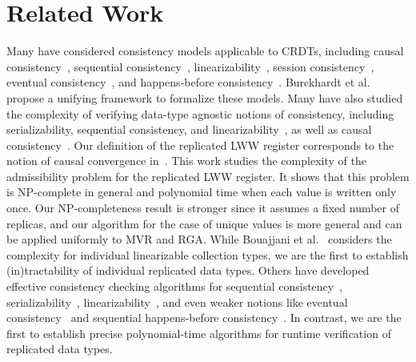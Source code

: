 
\section{Related Work}
\label{sec:crdt:related}

Many have considered consistency models applicable to CRDTs, including causal consistency~\cite{DBLP:journals/cacm/Lamport78}, sequential consistency~\cite{DBLP:journals/tc/Lamport79}, linearizability~\cite{DBLP:journals/toplas/HerlihyW90}, session consistency~\cite{DBLP:conf/pdis/TerryDPSTW94}, eventual consistency~\cite{DBLP:conf/sosp/TerryTPDSH95}, and happens-before consistency~\cite{DBLP:conf/popl/MansonPA05}. Burckhardt et al.~\cite{DBLP:journals/ftpl/Burckhardt14, DBLP:conf/popl/BurckhardtGYZ14} propose a unifying framework to formalize these models. Many have also studied the complexity of verifying data-type agnostic notions of consistency, including serializability, sequential consistency, and linearizability~\cite{DBLP:journals/jacm/Papadimitriou79b, DBLP:journals/siamcomp/GibbonsK97, DBLP:journals/iandc/AlurMP00, DBLP:conf/spaa/BinghamCH03, DBLP:conf/cav/FarzanM08, DBLP:conf/esop/BouajjaniEEH13, DBLP:conf/netys/Hamza15}, as well as causal consistency~\cite{DBLP:conf/popl/BouajjaniEGH17}. Our definition of the replicated LWW register corresponds to the notion of causal convergence in~\cite{DBLP:conf/popl/BouajjaniEGH17}. This work studies the complexity of the admissibility problem for the replicated LWW register. It shows that this problem is NP-complete in general and polynomial time when each value is written only once. 
Our NP-completeness result is stronger since it assumes a fixed number of replicas, and our algorithm for the case of unique values is more general and can be applied uniformly to MVR and RGA. 
While Bouajjani et al.~\cite{DBLP:journals/iandc/BouajjaniEEH18, DBLP:journals/pacmpl/EmmiE18} considers the complexity for individual linearizable collection types, we are the first to establish (in)tractability of individual replicated data types. Others have developed effective consistency checking algorithms for sequential consistency~\cite{DBLP:conf/cav/HenzingerQR99a, DBLP:journals/tpds/Qadeer03, DBLP:conf/cav/BinghamCHQZ04, DBLP:conf/pldi/BurckhardtAM07}, serializability~\cite{DBLP:conf/fmcad/0002OPTZ07, DBLP:conf/cav/FarzanM08, DBLP:conf/pldi/GuerraouiHJS08, DBLP:conf/pldi/EmmiMM10}, linearizability~\cite{DBLP:journals/jpdc/WingG93, DBLP:conf/pldi/BurckhardtDMT10, DBLP:conf/pldi/EmmiEH15, DBLP:journals/concurrency/Lowe17}, and even weaker notions like eventual consistency~\cite{DBLP:conf/popl/BouajjaniEH14} and sequential happens-before consistency~\cite{DBLP:conf/cav/EmmiE18, DBLP:journals/pacmpl/EmmiE19}. 
In contrast, we are the first to establish precise polynomial-time algorithms for runtime verification of replicated data types.
